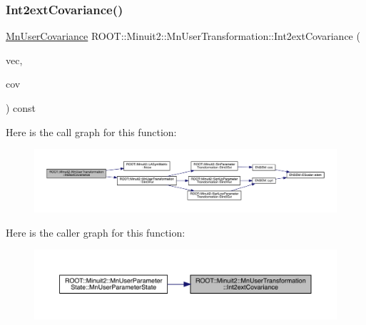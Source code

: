 \subsubsection{\texorpdfstring{Int2extCovariance()}{Int2extCovariance()}\hspace{0.1cm}{\footnotesize\ttfamily [3/3]}}
{\footnotesize\ttfamily \mbox{\hyperlink{classROOT_1_1Minuit2_1_1MnUserCovariance}{Mn\+User\+Covariance}} R\+O\+O\+T\+::\+Minuit2\+::\+Mn\+User\+Transformation\+::\+Int2ext\+Covariance (\begin{DoxyParamCaption}\item[{const \mbox{\hyperlink{namespaceROOT_1_1Minuit2_a62ed97730a1ca8d3fbaec64a19aa11c9}{Mn\+Algebraic\+Vector}} \&}]{vec,  }\item[{const \mbox{\hyperlink{namespaceROOT_1_1Minuit2_a9e74ad97f5537a2e80e52b04d98ecc6e}{Mn\+Algebraic\+Sym\+Matrix}} \&}]{cov }\end{DoxyParamCaption}) const}

Here is the call graph for this function\+:
\nopagebreak
\begin{figure}[H]
\begin{center}
\leavevmode
\includegraphics[width=350pt]{d9/d98/classROOT_1_1Minuit2_1_1MnUserTransformation_a10f2146be0a2c991243dd2f70a943a15_cgraph}
\end{center}
\end{figure}
Here is the caller graph for this function\+:
\nopagebreak
\begin{figure}[H]
\begin{center}
\leavevmode
\includegraphics[width=350pt]{d9/d98/classROOT_1_1Minuit2_1_1MnUserTransformation_a10f2146be0a2c991243dd2f70a943a15_icgraph}
\end{center}
\end{figure}
\mbox{\label{classROOT_1_1Minuit2_1_1MnUserTransformation_ad900f367f4d2c5df13f899dd55bdf212}} 
